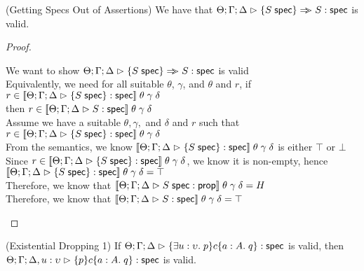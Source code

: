 \begin{lemma}{(Getting Specs Out of Assertions)}
We have that $\judgeS{\setof{\validprop{S}} \specimp S}$ is valid.
\end{lemma}
\begin{proof}
  \begin{tabbedproof}
    \oo We want to show $\judgeS{\setof{\validprop{S}} \specimp S}$ is valid \\
    \oo Equivalently, we need for all suitable $\theta$, $\gamma$, and $\theta$ and $r$, if $r \in \interp{\judgeS{\setof{\validprop{S}}}}\;\theta\;\gamma\;\delta$\\
    \ox    then $r \in \interp{\judgeS{S}}\;\theta\;\gamma\;\delta$ \\
    \oo Assume we have a suitable $\theta, \gamma,$ and $\delta$ and $r$ such that $r \in \interp{\judgeS{\setof{\validprop{S}}}}\;\theta\;\gamma\;\delta$ \\
    \ooo From the semantics, we know $\interp{\judgeS{\setof{\validprop{S}}}}\;\theta\;\gamma\;\delta$ is either $\top$ or $\bot$ \\
    \ooo Since $r \in \interp{\judgeS{\setof{\validprop{S}}}}\;\theta\;\gamma\;\delta$, we know it is non-empty, hence \\
    \ooox $\interp{\judgeS{\setof{\validprop{S}}}}\;\theta\;\gamma\;\delta = \top$ \\
    \ooo Therefore, we know that $\interp{\judgeA{\validprop{S}}{\assert}}\;\theta\;\gamma\;\delta = H$ \\
    \ooo Therefore, we know that $\interp{\judgeS{S}}\;\theta\;\gamma\;\delta = \top$ \\
  \end{tabbedproof}
\end{proof}

\begin{lemma}{(Existential Dropping 1)}
If $\judgeS{\spec{\exists u:\upsilon.\;p}{c}{a:A}{q}}$ is valid, then 
   $\judgeS[\Theta; \Gamma; \Delta, u:\upsilon]{\spec{p}{c}{a:A}{q}}$ is valid. 
\end{lemma}

